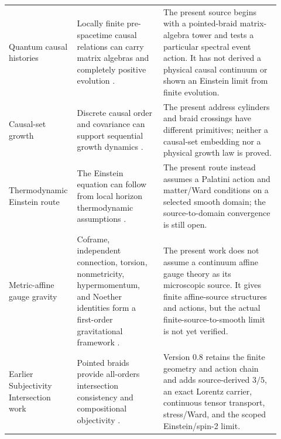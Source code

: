 {\begin{longtable}{>{\raggedright\arraybackslash}p{0.19\linewidth}>{\raggedright\arraybackslash}p{0.31\linewidth}>{\raggedright\arraybackslash}p{0.42\linewidth}}
Quantum causal histories & Locally finite pre-spacetime causal relations can carry matrix algebras and completely positive evolution \cite{hawkins2003}. & The present source begins with a pointed-braid matrix-algebra tower and tests a particular spectral event action. It has not derived a physical causal continuum or shown an Einstein limit from finite evolution. \\
Causal-set growth & Discrete causal order and covariance can support sequential growth dynamics \cite{rideout1999}. & The present address cylinders and braid crossings have different primitives; neither a causal-set embedding nor a physical growth law is proved. \\
Thermodynamic Einstein route & The Einstein equation can follow from local horizon thermodynamic assumptions \cite{jacobson1995}. & The present route instead assumes a Palatini action and matter/Ward conditions on a selected smooth domain; the source-to-domain convergence is still open. \\
Metric-affine gauge gravity & Coframe, independent connection, torsion, nonmetricity, hypermomentum, and Noether identities form a first-order gravitational framework \cite{hehl1995}. & The present work does not assume a continuum affine gauge theory as its microscopic source. It gives finite affine-source structures and actions, but the actual finite-source-to-smooth limit is not yet verified. \\
Earlier Subjectivity Intersection work & Pointed braids provide all-orders intersection consistency and compositional objectivity \cite{watanabe2026braid}. & Version 0.8 retains the finite geometry and action chain and adds source-derived $3/5$, an exact Lorentz carrier, continuous tensor transport, stress/Ward, and the scoped Einstein/spin-2 limit. \\
\bottomrule
\end{longtable}
}

